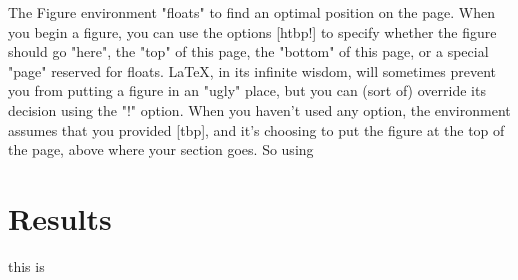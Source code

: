 The Figure environment "floats" to find an optimal position on the page. When you begin a figure, you can use the options [htbp!] to specify whether the figure should go "here", the "top" of this page, the "bottom" of this page, or a special "page" reserved for floats. LaTeX, in its infinite wisdom, will sometimes prevent you from putting a figure in an "ugly" place, but you can (sort of) override its decision using the "!" option. When you haven't used any option, the environment assumes that you provided [tbp], and it's choosing to put the figure at the top of the page, above where your section goes. So using


\section{Results}
this is 

%

